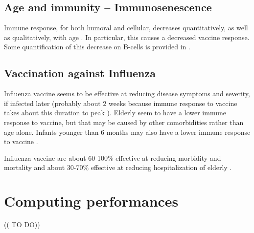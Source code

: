 \documentclass[11pt, onecolumn]{article}
\begin{document}
\subsection{Age and immunity -- Immunosenescence}

Immune response, for both humoral and cellular, decreases quantitatively, as well as qualitatively, with age \cite{Vallejo:2011fe}. In particular, this causes a decreased vaccine response. Some quantification of this decrease on B-cells is provided in \cite{Frasca:2011bj,LeMaoult:1997wf}.


\subsection{Vaccination against Influenza }

Influenza vaccine seems to be effective at reducing disease symptoms and severity, if infected later (probably about 2 weeks because immune response to vaccine takes about this duration to peak \cite{Cox:2004vo}). 
Elderly seem to have a lower immune response to vaccine, but that may be caused by other comorbidities rather than age alone. Infants younger than 6 months may also have a lower immune response to vaccine \cite{Cox:2004vo}.

Influenza vaccine are about 60-100\% effective at reducing morbidity and mortality and about 30-70\% effective at reducing hospitalization of elderly  \cite{Cox:2004vo}.


\section{Computing performances}

(( TO DO))


\newpage



\end{document}
